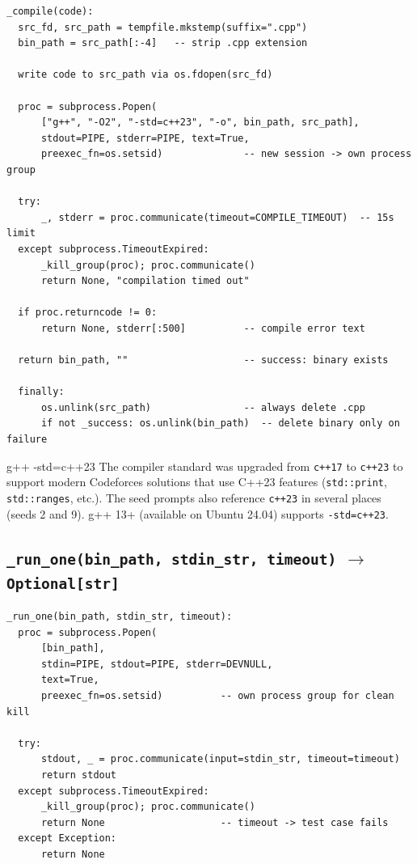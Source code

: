 \documentclass[11pt,a4paper]{report}
\newcommand{\fn}[1]{\texttt{#1}}
\begin{document}
\begin{lstlisting}[style=chain]
_compile(code):
  src_fd, src_path = tempfile.mkstemp(suffix=".cpp")
  bin_path = src_path[:-4]   -- strip .cpp extension

  write code to src_path via os.fdopen(src_fd)

  proc = subprocess.Popen(
      ["g++", "-O2", "-std=c++23", "-o", bin_path, src_path],
      stdout=PIPE, stderr=PIPE, text=True,
      preexec_fn=os.setsid)              -- new session -> own process group

  try:
      _, stderr = proc.communicate(timeout=COMPILE_TIMEOUT)  -- 15s limit
  except subprocess.TimeoutExpired:
      _kill_group(proc); proc.communicate()
      return None, "compilation timed out"

  if proc.returncode != 0:
      return None, stderr[:500]          -- compile error text

  return bin_path, ""                    -- success: binary exists

  finally:
      os.unlink(src_path)                -- always delete .cpp
      if not _success: os.unlink(bin_path)  -- delete binary only on failure
\end{lstlisting}

\begin{warnbox}{g++ -std=c++23}
The compiler standard was upgraded from \fn{c++17} to \fn{c++23} to support modern
Codeforces solutions that use C++23 features (\fn{std::print}, \fn{std::ranges}, etc.).
The seed prompts also reference \fn{c++23} in several places (seeds 2 and 9).
g++ 13+ (available on Ubuntu 24.04) supports \fn{-std=c++23}.
\end{warnbox}

\subsection{\fn{\_run\_one(bin\_path, stdin\_str, timeout)} $\to$ \fn{Optional[str]}}

\begin{lstlisting}[style=chain]
_run_one(bin_path, stdin_str, timeout):
  proc = subprocess.Popen(
      [bin_path],
      stdin=PIPE, stdout=PIPE, stderr=DEVNULL,
      text=True,
      preexec_fn=os.setsid)          -- own process group for clean kill

  try:
      stdout, _ = proc.communicate(input=stdin_str, timeout=timeout)
      return stdout
  except subprocess.TimeoutExpired:
      _kill_group(proc); proc.communicate()
      return None                    -- timeout -> test case fails
  except Exception:
      return None
\end{lstlisting}
\end{document}
